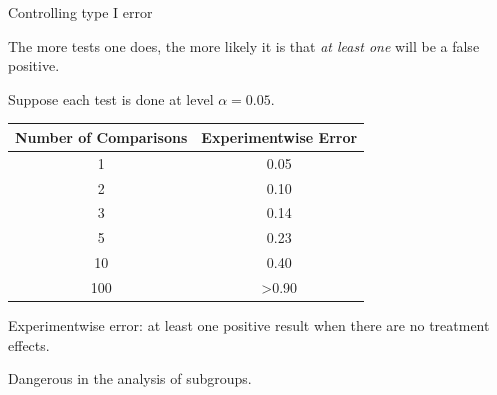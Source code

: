 \documentclass[ignorenonframetext,]{beamer}
\begin{document}
\begin{frame}{Controlling type I error}

The more tests one does, the more likely it is that \emph{at least one}
will be a false positive. \medskip

Suppose each test is done at level \(\alpha = 0.05\).

\begin{longtable}[]{@{}cc@{}}
\toprule
\begin{minipage}[b]{0.34\columnwidth}\centering\strut
Number of Comparisons\strut
\end{minipage} & \begin{minipage}[b]{0.38\columnwidth}\centering\strut
Experimentwise Error\strut
\end{minipage}\tabularnewline
\midrule
\endhead
\begin{minipage}[t]{0.34\columnwidth}\centering\strut
1\strut
\end{minipage} & \begin{minipage}[t]{0.38\columnwidth}\centering\strut
0.05\strut
\end{minipage}\tabularnewline
\begin{minipage}[t]{0.34\columnwidth}\centering\strut
2\strut
\end{minipage} & \begin{minipage}[t]{0.38\columnwidth}\centering\strut
0.10\strut
\end{minipage}\tabularnewline
\begin{minipage}[t]{0.34\columnwidth}\centering\strut
3\strut
\end{minipage} & \begin{minipage}[t]{0.38\columnwidth}\centering\strut
0.14\strut
\end{minipage}\tabularnewline
\begin{minipage}[t]{0.34\columnwidth}\centering\strut
5\strut
\end{minipage} & \begin{minipage}[t]{0.38\columnwidth}\centering\strut
0.23\strut
\end{minipage}\tabularnewline
\begin{minipage}[t]{0.34\columnwidth}\centering\strut
10\strut
\end{minipage} & \begin{minipage}[t]{0.38\columnwidth}\centering\strut
0.40\strut
\end{minipage}\tabularnewline
\begin{minipage}[t]{0.34\columnwidth}\centering\strut
100\strut
\end{minipage} & \begin{minipage}[t]{0.38\columnwidth}\centering\strut
\textgreater{}0.90\strut
\end{minipage}\tabularnewline
\bottomrule
\end{longtable}

Experimentwise error: at least one positive result when there are no
treatment effects.

Dangerous in the analysis of subgroups.

\end{frame}
\end{document}
